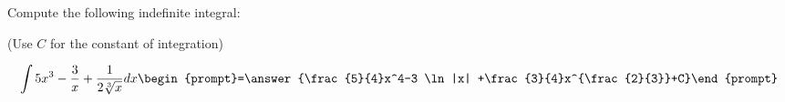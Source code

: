 \documentclass{ximera}
\author{Jim Talamo}
\begin{document}
\begin{exercise}
Compute the following indefinite integral: 

\begin{prompt} (Use $C$ for the constant of integration) \end{prompt}

\[
\int 5x^3-\frac{3}{x}+\frac{1}{2 \sqrt[3]{x}}  dx 
\begin{prompt}=\answer{\frac{5}{4}x^4-3 \ln |x| +\frac{3}{4}x^{\frac{2}{3}}+C}\end{prompt}
\]

\end{exercise}
\end{document}
